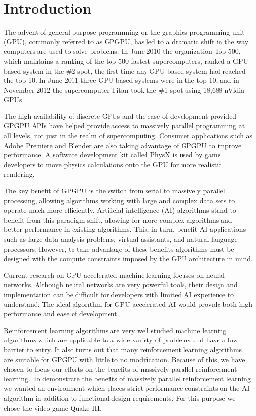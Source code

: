 \chapter{Introduction}

The advent of general purpose programming on the graphics programming unit (GPU), commonly referred to as GPGPU, has led to a dramatic shift in the way computers are used to solve problems. In June 2010 the organization Top 500, which maintains a ranking of the top 500 fastest supercomputers, ranked a GPU based system in the \#2 spot, the first time any GPU based system had reached the top 10. \cite{top500:2010} In June 2011 three GPU based systems were in the top 10, and in November 2012 the supercomputer Titan took the \#1 spot using 18,688 nVidia GPUs. \cite{top500:2011} \cite{top500:2012}

The high availability of discrete GPUs and the ease of development provided GPGPU APIs have helped provide access to massively parallel programming at all levels, not just in the realm of supercomputing. Consumer applications such as Adobe Premiere \cite{adobe} and Blender \cite{blender} are also taking advantage of GPGPU to improve performance. A software development kit called PhysX is used by game developers to move physics calculations onto the GPU for more realistic rendering. \cite{physx}

The key benefit of GPGPU is the switch from serial to massively parallel processing, allowing algorithms working with large and complex data sets to operate much more efficiently. Artificial intelligence (AI) algorithms stand to benefit from this paradigm shift, allowing for more complex algorithms and better performance in existing algorithms. This, in turn, benefit AI applications such as large data analysis problems, virtual assistants, and natural language processors. However, to take advantage of these benefits algorithms must be designed with the compute constraints imposed by the GPU architecture in mind.

Current research on GPU accelerated machine learning focuses on neural networks. \cite{neuralnet} Although neural networks are very powerful tools, their design and implementation can be difficult for developers with limited AI experience to understand. The ideal algorithm for GPU accelerated AI would provide both high performance and ease of development.

Reinforcement learning algorithms are very well studied machine learning algorithms which are applicable to a wide variety of problems and have a low barrier to entry. It also turns out that many reinforcement learning algorithms are suitable for GPGPU with little to no modification. Because of this, we have chosen to focus our efforts on the benefits of massively parallel reinforcement learning. To demonstrate the benefits of massively parallel reinforcement learning we wanted an environment which places strict performance constraints on the AI algorithm in addition to functional design requirements. For this purpose we chose the video game Quake III. 

